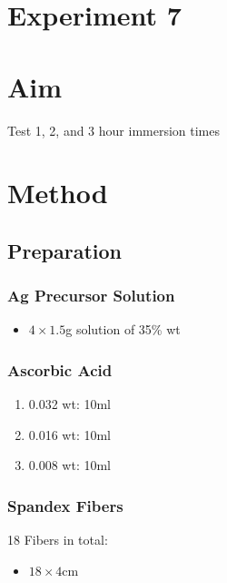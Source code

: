 \documentclass{article}
\begin{document}
\section*{Experiment 7}

\section{Aim}
Test 1, 2, and 3 hour immersion times 

\section{Method}
\subsection{Preparation}
\subsubsection{Ag Precursor Solution}
\begin{itemize}
    \item  $4 \times 1.5$g solution of  35\% wt
\end{itemize}

\subsubsection{Ascorbic Acid}
\begin{enumerate}
    \item 0.032 wt: 10ml
    \item 0.016 wt: 10ml
    \item 0.008 wt: 10ml
\end{enumerate}

\subsubsection{Spandex Fibers}
18 Fibers in total:
\begin{itemize}
    \item $18\times 4$cm
\end{itemize}
\end{document}
